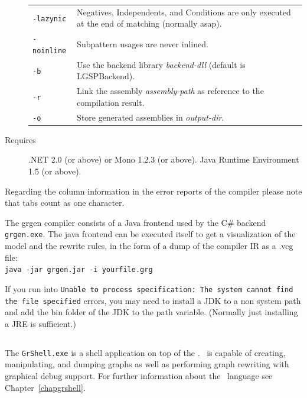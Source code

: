 \begin{description}
\begin{tabularx}{\linewidth}{lX}
      \texttt{-lazynic} & Negatives, Independents, and Conditions are only executed at the end of matching (normally asap).\\
      \texttt{-noinline} & Subpattern usages are never inlined.\\
      \texttt{-b} & Use the backend library \emph{backend-dll} (default is LGSPBackend).\\
      \texttt{-r} & Link the assembly \emph{assembly-path} as reference to the compilation result.\\
      \texttt{-o} & Store generated assemblies in \emph{output-dir}.
    \end{tabularx}
  \item[Requires] .NET 2.0 (or above) or Mono 1.2.3 (or above). Java Runtime Environment 1.5 (or above).
\end{description}

\begin{note}
Regarding the column information in the error reports of the compiler please note that tabs count as one character.
\end{note}

\begin{note}\label{note:modelruledump}
The grgen compiler consists of a Java frontend used by the C\# backend \texttt{grgen.exe}.
The java frontend can be executed itself to get a visualization of the model and the rewrite rules,
in the form of a dump of the compiler IR as a .vcg file:\\
\texttt{java -jar grgen.jar -i yourfile.grg}
\end{note}

\begin{note}
If you run into \texttt{Unable to process specification: The system cannot find the file specified} errors, 
you may need to install a JDK to a non system path and add the bin folder of the JDK to the path variable.
(Normally just installing a JRE is sufficient.)
\end{note}


\subsection{\texttt{}}

\noindent The \texttt{GrShell.exe} is a shell application on top of the \LibGr.
\GrShell\ is capable of creating, manipulating, and dumping graphs as well as performing graph rewriting with graphical debug support.
For further information about the \GrShell\ language see Chapter~\ref{chapgrshell}.

